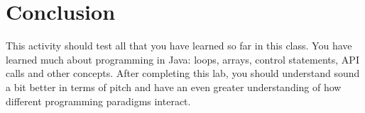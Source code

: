 \section{Conclusion}

This activity should test all that you have learned so far in this class.  
You have learned much about programming in Java: loops, arrays, control statements, API calls and other concepts.  
After completing this lab, you should understand sound a bit better in terms of pitch and have an even greater understanding of how different programming paradigms interact.

